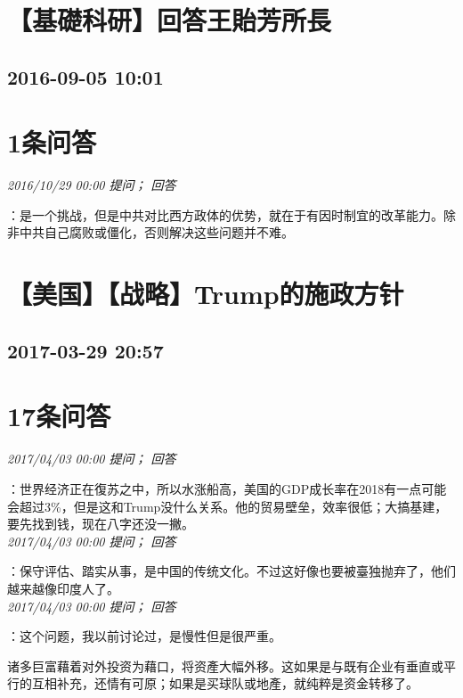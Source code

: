 \documentclass[twocolumn]{ctexart}
\begin{document}
\section{【基礎科研】回答王貽芳所長}
\subsection{2016-09-05 10:01}


\section{1条问答}

\textit{\hfill\noindent\small 2016/10/29 00:00 提问； 回答}

：是一个挑战，但是中共对比西方政体的优势，就在于有因时制宜的改革能力。除非中共自己腐败或僵化，否则解决这些问题并不难。\\


\section{【美国】【战略】Trump的施政方针}
\subsection{2017-03-29 20:57}


\section{17条问答}

\textit{\hfill\noindent\small 2017/04/03 00:00 提问； 回答}

：世界经济正在復苏之中，所以水涨船高，美国的GDP成长率在2018有一点可能会超过3\%，但是这和Trump没什么关系。他的贸易壁垒，效率很低；大搞基建，要先找到钱，现在八字还没一撇。\\

\textit{\hfill\noindent\small 2017/04/03 00:00 提问； 回答}

：保守评估、踏实从事，是中国的传统文化。不过这好像也要被臺独抛弃了，他们越来越像印度人了。\\

\textit{\hfill\noindent\small 2017/04/03 00:00 提问； 回答}

：这个问题，我以前讨论过，是慢性但是很严重。

诸多巨富藉着对外投资为藉口，将资產大幅外移。这如果是与既有企业有垂直或平行的互相补充，还情有可原；如果是买球队或地產，就纯粹是资金转移了。
\end{document}
